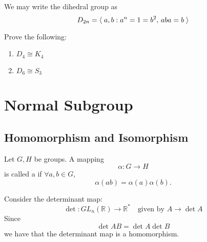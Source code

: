 \begin{eg}
  We may write the dihedral group as
  \begin{equation*}
    D_{2n} = \langle \;  a, b : a^n = 1 = b^2, \, aba = b  \; \rangle
  \end{equation*}
\end{eg}

\begin{ex}
  Prove the following:
  \begin{enumerate}
    \item $D_4 \cong K_4$
    \item $D_6 \cong S_3$
  \end{enumerate}
\end{ex}



\section{Normal Subgroup}%
\label{sec:normal_subgroup}

\subsection{Homomorphism and Isomorphism}%
\label{sub:homomorphism_and_isomorphism}

\begin{defn}[Homomorphism]
\label{defn:homomorphism}
  Let $G, H$ be groups. A mapping
  \begin{equation*}
    \alpha : G \to H
  \end{equation*}
  is called a  if $\forall a, b \in G$,
  \begin{equation*}
    \alpha(ab) = \alpha(a)\alpha(b).
  \end{equation*}
\end{defn}

\begin{eg}\label{eg:homomorphism_classical_eg}
  Consider the determinant map:
  \begin{equation*}
    \det : GL_n(\mathbb{R}) \to \mathbb{R}^* \quad \text{given by } A \to \det A
  \end{equation*}
  Since
  \begin{equation*}
    \det AB = \det A \det B
  \end{equation*}
  we have that the determinant map is a homomorphism.
\end{eg}

